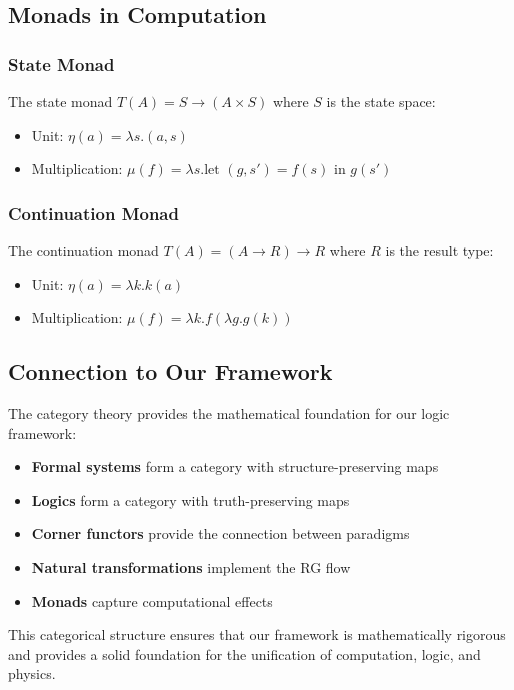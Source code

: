 \subsection{Monads in Computation}

\subsubsection{State Monad}

\begin{definition}
The state monad $T(A) = S \to (A \times S)$ where $S$ is the state space:
\begin{itemize}
\item Unit: $\eta(a) = \lambda s. (a, s)$
\item Multiplication: $\mu(f) = \lambda s. \text{let } (g, s') = f(s) \text{ in } g(s')$
\end{itemize}
\end{definition}

\subsubsection{Continuation Monad}

\begin{definition}
The continuation monad $T(A) = (A \to R) \to R$ where $R$ is the result type:
\begin{itemize}
\item Unit: $\eta(a) = \lambda k. k(a)$
\item Multiplication: $\mu(f) = \lambda k. f(\lambda g. g(k))$
\end{itemize}
\end{definition}

\subsection{Connection to Our Framework}

The category theory provides the mathematical foundation for our logic framework:

\begin{itemize}
\item \textbf{Formal systems} form a category with structure-preserving maps
\item \textbf{Logics} form a category with truth-preserving maps
\item \textbf{Corner functors} provide the connection between paradigms
\item \textbf{Natural transformations} implement the RG flow
\item \textbf{Monads} capture computational effects
\end{itemize}

This categorical structure ensures that our framework is mathematically rigorous and provides a solid foundation for the unification of computation, logic, and physics.
